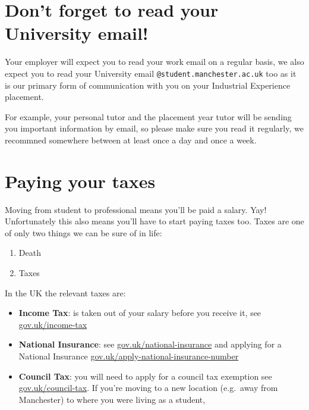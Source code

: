 \documentclass[
]{book}
\providecommand{\tightlist}{%
  \setlength{\itemsep}{0pt}\setlength{\parskip}{0pt}}
\begin{document}
\section{Don't forget to read your University email!}\label{email}

Your employer will expect you to read your work email on a regular basis, we also expect you to read your University email \texttt{@student.manchester.ac.uk} too as it is our primary form of communication with you on your Industrial Experience placement.

For example, your personal tutor and the placement year tutor will be sending you important information by email, so please make sure you read it regularly, we recommned somewhere between at least once a day and once a week.

\section{Paying your taxes}\label{taxes}

Moving from student to professional means you'll be paid a salary. Yay! Unfortunately this also means you'll have to start paying taxes too. Taxes are one of only two things we can be sure of in life:

\begin{enumerate}
\def\labelenumi{\arabic{enumi}.}
\tightlist
\item
  Death \citep{death}
\item
  Taxes \citep{death}
\end{enumerate}

In the UK the relevant taxes are:

\begin{itemize}
\tightlist
\item
  \textbf{Income Tax}: is taken out of your salary before you receive it, see \href{https://www.gov.uk/income-tax}{gov.uk/income-tax} \citep{income-tax}
\item
  \textbf{National Insurance}: see \href{https://www.gov.uk/national-insurance}{gov.uk/national-insurance} \citep{national} and applying for a National Insurance \href{https://www.gov.uk/apply-national-insurance-number}{gov.uk/apply-national-insurance-number} \citep{apply}
\item
  \textbf{Council Tax}: you will need to apply for a council tax exemption see \href{https://www.gov.uk/council-tax}{gov.uk/council-tax}\citep{council-tax}. If you're moving to a new location (e.g.~away from Manchester) to where you were living as a student, \citep{exemption1, exemption2}
\end{itemize}
\end{document}
